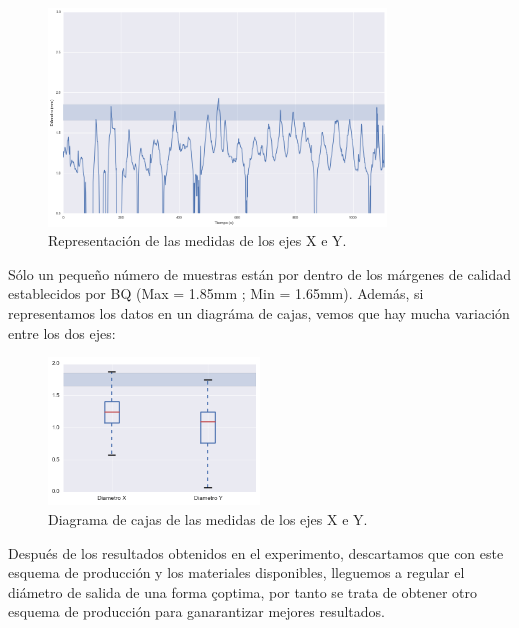 		\begin{figure}[H]
	            \centering
	            \includegraphics[width=0.8\textwidth]{images/producciones/16062015/output_9_1.png}
	            \caption{Representación de las medidas de los ejes X e Y.}
	            \label{fig:prod_ejes}
	    \end{figure}

Sólo un pequeño número de muestras están por dentro de los márgenes de calidad establecidos por BQ (Max = 1.85mm ; Min = 1.65mm). Además, si representamos los datos en un diagráma de cajas, vemos que hay mucha variación entre los dos ejes:
		\begin{figure}[H]
	            \centering
	            \includegraphics[width=0.5\textwidth]{images/producciones/16062015/output_10_1.png}
	            \caption{Diagrama de cajas de las medidas de los ejes X e Y.}
	            \label{fig:prod_boxplot}
	    \end{figure}

Después de los resultados obtenidos en el experimento, descartamos que con este esquema de producción y los materiales disponibles, lleguemos a regular el diámetro de salida de una forma çoptima, por tanto se trata de obtener otro esquema de producción para ganarantizar mejores resultados.